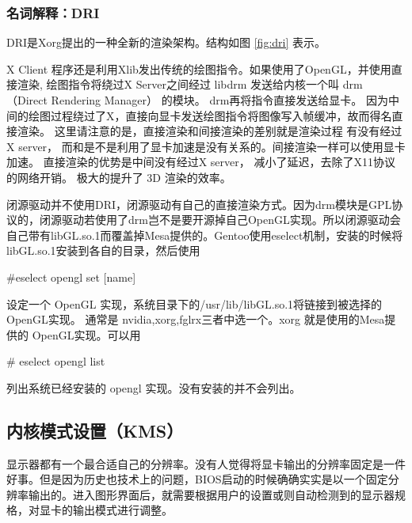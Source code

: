 \begin{insertnote}

\subsubsection{名词解释：DRI}

DRI是Xorg提出的一种全新的渲染架构。结构如图 \ref{fig:dri} 表示。



X Client 程序还是利用Xlib发出传统的绘图指令。如果使用了OpenGL，并使用直接渲染, 绘图指令将绕过X Server之间经过 libdrm 发送给内核一个叫 drm （Direct Rendering Manager） 的模块。
drm再将指令直接发送给显卡。 因为中间的绘图过程绕过了X，直接向显卡发送绘图指令将图像写入帧缓冲，故而得名直接渲染。 这里请注意的是，直接渲染和间接渲染的差别就是渲染过程 有没有经过X server， 而和是不是利用了显卡加速是没有关系的。间接渲染一样可以使用显卡加速。 直接渲染的优势是中间没有经过X server， 减小了延迟，去除了X11协议的网络开销。
极大的提升了 3D 渲染的效率。


闭源驱动并不使用DRI，闭源驱动有自己的直接渲染方式。因为drm模块是GPL协议的，闭源驱动若使用了drm岂不是要开源掉自己OpenGL实现。所以闭源驱动会自己带有libGL.so.1而覆盖掉Mesa提供的。Gentoo使用eselect机制，安装的时候将libGL.so.1安装到各自的目录，然后使用
\begin{code}
\#eselect opengl set [name] 
\end{code}
设定一个 OpenGL 实现，系统目录下的/usr/lib/libGL.so.1将链接到被选择的OpenGL实现。
通常是 nvidia,xorg,fglrx三者中选一个。xorg 就是使用的Mesa提供的 OpenGL实现。可以用
\begin{code}
\# eselect opengl list
\end{code}
 列出系统已经安装的 opengl 实现。没有安装的并不会列出。

\end{insertnote}

\subsection{内核模式设置（KMS）}

显示器都有一个最合适自己的分辨率。没有人觉得将显卡输出的分辨率固定是一件好事。但是因为历史也技术上的问题，BIOS启动的时候确确实实是以一个固定分辨率输出的。进入图形界面后，就需要根据用户的设置或则自动检测到的显示器规格，对显卡的输出模式进行调整。

